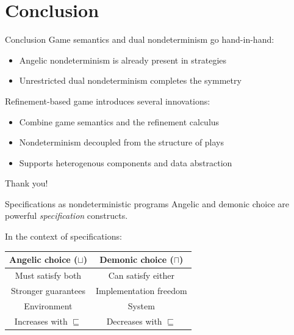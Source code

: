 \documentclass[aspectratio=54]{beamer}
\begin{document}

\section*{Conclusion} %

\begin{frame}{Conclusion}
  Game semantics and dual nondeterminism go hand-in-hand:
  \begin{itemize}
    \item Angelic nondeterminism is already present in strategies
    \item Unrestricted dual nondeterminism completes the symmetry
  \end{itemize}

  Refinement-based game introduces several innovations:
  \begin{itemize}
    \item Combine game semantics and the refinement calculus
    \item Nondeterminism decoupled from the structure of plays
    \item Supports heterogenous components and data abstraction
  \end{itemize}
\end{frame}


\begin{frame}{}
  \begin{center}
    Thank you!
  \end{center}
\end{frame}


\appendix

\begin{frame}{Specifications as nondeterministic programs} %
  Angelic and demonic choice are powerful
  \emph{specification} constructs.

  \pause
  In the context of specifications:
  \begin{center}
    \begin{tabular}{cc}
      \hline
      Angelic choice ($\sqcup$) & Demonic choice ($\sqcap$) \\
      \hline
      Must satisfy both & Can satisfy either \\
      Stronger guarantees & Implementation freedom \\
      Environment & System \\
      Increases with $\sqsubseteq$ & Decreases with $\sqsubseteq$ \\
      \hline
    \end{tabular}
  \end{center}
\end{frame}
\end{document}
